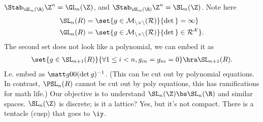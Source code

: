 $\Stab_{\GL_n(\R)}\Z^n = \GL_n(\Z)$, and $\Stab_{\SL_n(\R)}\Z^n = \SL_n(\Z)$. 
Note here %
\begin{align}
\SL_n(R) &= \set{g\in \cal M_{n\times n}(R)}{\det g=1}\\
\GL_n(R) &= \set{g\in \cal M_{n\times n}(R)}{\det g\in R^X}.
\end{align}
The second set does not look like a polynomial, we can embed it as 
\begin{align}
\set{g\in \SL_{n+1}(R)}{\forall 1\le i<n, g_{in}=g_{ni}=0}
\hra \SL_{n+1}(R).
\end{align}
I.e. embed as $\matt g 00{(\det g)^{-1}}$. 
(This can be cut out by polynomial equations. In contrast, 
$\PSL_n(R)$ cannot be cut out by poly equations, this has ramifications for math life.)
Our objective is to understand $\SL_n(\Z)\bs \SL_n(\R)$ and similar spaces. $\SL_n(\Z)$ is discrete; is it a lattice? Yes, but it's not compact. 
There is a tentacle (cusp) that goes to $\iy$.


